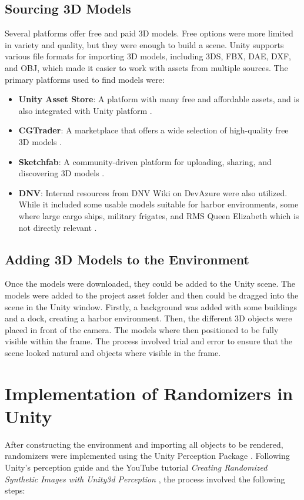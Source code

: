\subsection{Sourcing 3D Models}
Several platforms offer free and paid 3D models. Free options were more limited in variety and quality, but they were enough to build a scene. Unity supports various file formats for importing 3D models, including 3DS, FBX, DAE, DXF, and OBJ, which made it easier to work with assets from multiple sources. The primary platforms used to find models were:
\begin{itemize}
\item \textbf{Unity Asset Store}: A platform with many free and affordable assets, and is also integrated with Unity platform \cite{UnityAssetStore}.
\item \textbf{CGTrader}: A marketplace that offers a wide selection of high-quality free 3D models \cite{cgtrader}.
\item \textbf{Sketchfab}: A community-driven platform for uploading, sharing, and discovering 3D models \cite{sketchfab}.
\item \textbf{DNV}: Internal resources from DNV Wiki on DevAzure were also utilized. While it included some usable models suitable for harbor environments, some where large cargo ships, military frigates, and RMS Queen Elizabeth which is not directly relevant \cite{dnv_wiki}.

\end{itemize}

\subsection{Adding 3D Models to the Environment}
Once the models were downloaded, they could be added to the Unity scene. The models were added to the project asset folder and then could be dragged into the scene in the Unity window. Firstly, a background was added with some buildings and a dock, creating a harbor environment. Then, the different 3D objects were placed in front of the camera. The models where then positioned to be fully visible within the frame. The process involved trial and error to ensure that the scene looked natural and objects where visible in the frame.


\section{Implementation of Randomizers in Unity}
\label{section:Implementation of Randomizers in Unity}
After constructing the environment and importing all objects to be rendered, randomizers were implemented using the Unity Perception Package \cite{unity-perception2022}. Following Unity's perception guide \cite{unity-perception2022} and the YouTube tutorial \textit{Creating Randomized Synthetic Images with Unity3d Perception} \cite{secrets_of_apagayo_island_video}, the process involved the following steps:

